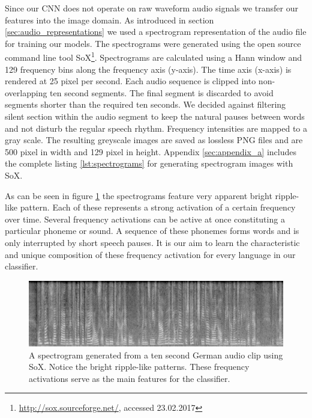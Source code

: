 	Since our CNN does not operate on raw waveform audio signals we transfer our features into the image domain. As introduced in section \ref{sec:audio_representations} we used a spectrogram representation of the audio file for training our models. The spectrograms were generated using the open source command line tool SoX\footnote{\url{http://sox.sourceforge.net/}, accessed 23.02.2017}. Spectrograms are calculated using a Hann window and 129 frequency bins along the frequency axis (y-axis). The time axis (x-axis) is rendered at 25 pixel per second. Each audio sequence is clipped into non-overlapping ten second segments. The  final segment is discarded to avoid segments shorter than the required ten seconds. We decided against filtering silent section within the audio segment to keep the natural pauses between words and not disturb the regular speech rhythm. Frequency intensities are mapped to a gray scale. The resulting greyscale images are saved as lossless PNG files and are 500 pixel in width and 129 pixel in height. Appendix \ref{sec:appendix_a} includes the complete listing \ref{lst:spectrograms} for generating spectrogram images with SoX.
	
	As can be seen in figure \ref{fig:spectrogram} the spectrograms feature very apparent bright ripple-like pattern. Each of these represents a strong activation of a certain frequency over time. Several frequency activations can be active at once constituting a particular phoneme or sound. A sequence of these phonemes forms words and is only interrupted by short speech pauses. It is our aim to learn the characteristic and unique composition of these frequency activation for every language in our classifier. 

	
	\begin{figure}[h]
  		\centering
    	\includegraphics[width=\textwidth,keepaspectratio]{img/spectrogram.png}
    	\caption{A spectrogram generated from a ten second German audio clip  using SoX. Notice the bright ripple-like patterns. These frequency activations serve as the main features for the classifier.}
    	\label{fig:spectrogram}
	\end{figure}
	

